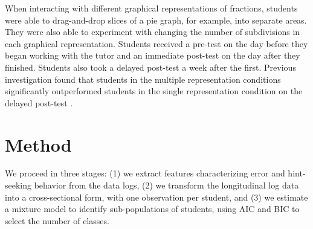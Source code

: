 \documentclass{edm_template}
\begin{document}
When interacting with different graphical representations of fractions, students were able to drag-and-drop slices of a pie graph, for example, into separate areas. They were also able to experiment with changing the number of subdivisions in each graphical representation. Students received a pre-test on the day before they began working with the tutor and an immediate post-test on the day after they finished. Students also took a delayed post-test a week after the first. Previous investigation found that students in the multiple representation conditions significantly outperformed students in the single representation condition on the delayed post-test \cite{Rau2012}. 


 
\section{Method}
\label{sec:method}

We proceed in three stages: (1) we extract features characterizing error and hint-seeking behavior from the data logs, (2) we transform the longitudinal log data into a cross-sectional form, with one observation per student, and (3) we estimate a mixture model to identify sub-populations of students, using AIC and BIC to select the number of classes. 
\end{document}
